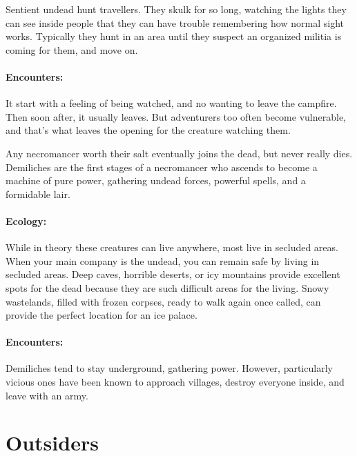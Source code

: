\begin{multicols}{2}
Sentient undead hunt travellers.  They skulk for so long, watching the lights they can see inside people that they can have trouble remembering how normal sight works.  Typically they hunt in an area until they suspect an organized militia is coming for them, and move on.

\paragraph{Encounters:}  It start with a feeling of being watched, and no wanting to leave the campfire.  Then soon after, it usually leaves.  But adventurers too often become vulnerable, and that's what leaves the opening for the creature watching them.

\label{demilich}

Any necromancer worth their salt eventually joins the dead, but never really dies.  Demiliches are the first stages of a necromancer who ascends to become a machine of pure power, gathering undead forces, powerful spells, and a formidable lair.

\paragraph{Ecology:} While in theory these creatures can live anywhere, most live in secluded areas.  When your main company is the undead, you can remain safe by living in secluded areas.  Deep caves, horrible deserts, or icy mountains provide excellent spots for the dead because they are such difficult areas for the living.  Snowy wastelands, filled with frozen corpses, ready to walk again once called, can provide the perfect location for an ice palace.

\paragraph{Encounters:} Demiliches tend to stay underground, gathering power.
However, particularly vicious ones have been known to approach villages, destroy everyone inside, and leave with an army.

\demilich

\end{multicols}

\section{Outsiders}

